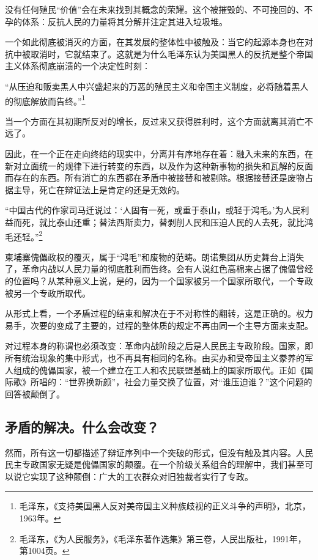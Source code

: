 \documentclass[fontset=fandol, a4paper, 12pt, twoside]{ctexart}
\renewenvironment{quote}
  {\list{}{\rightmargin=0cm \leftmargin=2em}%
   \item\relax\small\kaishu\color{black}}
  {\endlist}
\begin{document}
没有任何殖民“价值”会在未来找到其概念的荣耀。这个被摧毁的、不可挽回的、不孕的体系：反抗人民的力量将其分解并注定其进入垃圾堆。

一个如此彻底被消灭的方面，在其发展的整体性中被触及：当它的起源本身也在对抗中被取消时，它就结束了。这就是为什么毛泽东认为美国黑人的反抗是整个帝国主义体系彻底崩溃的一个决定性时刻：

\begin{quote}
“从压迫和贩卖黑人中兴盛起来的万恶的殖民主义和帝国主义制度，必将随着黑人的彻底解放而告终。”\footnote{毛泽东，《支持美国黑人反对美帝国主义种族歧视的正义斗争的声明》，北京，1963年。}
\end{quote}

当一个方面在其初期所反对的增长，反过来又获得胜利时，这个方面就离其消亡不远了。

因此，在一个正在走向终结的现实中，分离并有序地存在着：融入未来的东西，在新对立面统一的规律下进行转变的东西，以及作为这种新事物的损失和瓦解的反面而存在的东西。所有消亡的东西都在矛盾中被接替和被剔除。根据接替还是废物占据主导，死亡在辩证法上是肯定的还是无效的。

\begin{quote}
“中国古代的作家司马迁说过：‘人固有一死，或重于泰山，或轻于鸿毛。’为人民利益而死，就比泰山还重；替法西斯卖力，替剥削人民和压迫人民的人去死，就比鸿毛还轻。”\footnote{毛泽东，《为人民服务》，《毛泽东著作选集》第三卷，人民出版社，1991年，第1004页。}
\end{quote}

柬埔寨傀儡政权的覆灭，属于“鸿毛”和废物的范畴。朗诺集团从历史舞台上消失了，革命内战以人民力量的彻底胜利而告终。会有人说红色高棉来占据了傀儡曾经的位置吗？从某种意义上说，是的，因为一个国家被另一个国家所取代，一个专政被另一个专政所取代。

从形式上看，一个矛盾过程的结束和解决在于不对称性的翻转，这是正确的。权力易手，次要的变成了主要的，过程的整体质的规定不再由同一个主导方面来支配。

对过程本身的称谓也必须改变：革命内战阶段之后是人民民主专政阶段。国家，即所有统治现象的集中形式，也不再具有相同的名称。由买办和受帝国主义豢养的军人组成的傀儡国家，被一个建立在工人和农民联盟基础上的国家所取代。正如《国际歌》所唱的：“世界换新颜”，社会力量交换了位置，对“谁压迫谁？”这个问题的回答被颠倒了。

\subsection{矛盾的解决。什么会改变？}

然而，所有这一切都描述了辩证序列中一个突破的形式，但没有触及其内容。人民民主专政国家无疑是傀儡国家的颠覆。在一个阶级关系组合的理解中，我们甚至可以说它实现了这种颠倒：广大的工农群众对旧独裁者实行了专政。
\end{document}
